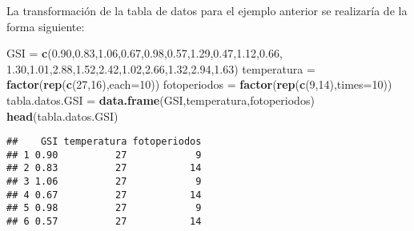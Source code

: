 \documentclass[
]{article}
\newenvironment{Shaded}{\begin{snugshade}}{\end{snugshade}}
\newcommand{\DataTypeTok}[1]{\textcolor[rgb]{0.13,0.29,0.53}{#1}}
\newcommand{\DecValTok}[1]{\textcolor[rgb]{0.00,0.00,0.81}{#1}}
\newcommand{\FloatTok}[1]{\textcolor[rgb]{0.00,0.00,0.81}{#1}}
\newcommand{\KeywordTok}[1]{\textcolor[rgb]{0.13,0.29,0.53}{\textbf{#1}}}
\newcommand{\NormalTok}[1]{#1}
\newcommand{\StringTok}[1]{\textcolor[rgb]{0.31,0.60,0.02}{#1}}
\begin{document}
\begin{example}

La transformación de la tabla de datos para el ejemplo anterior se
realizaría de la forma siguiente:

\begin{Shaded}
\begin{Highlighting}[]
\NormalTok{GSI =}\StringTok{ }\KeywordTok{c}\NormalTok{(}\FloatTok{0.90}\NormalTok{,}\FloatTok{0.83}\NormalTok{,}\FloatTok{1.06}\NormalTok{,}\FloatTok{0.67}\NormalTok{,}\FloatTok{0.98}\NormalTok{,}\FloatTok{0.57}\NormalTok{,}\FloatTok{1.29}\NormalTok{,}\FloatTok{0.47}\NormalTok{,}\FloatTok{1.12}\NormalTok{,}\FloatTok{0.66}\NormalTok{,}
        \FloatTok{1.30}\NormalTok{,}\FloatTok{1.01}\NormalTok{,}\FloatTok{2.88}\NormalTok{,}\FloatTok{1.52}\NormalTok{,}\FloatTok{2.42}\NormalTok{,}\FloatTok{1.02}\NormalTok{,}\FloatTok{2.66}\NormalTok{,}\FloatTok{1.32}\NormalTok{,}\FloatTok{2.94}\NormalTok{,}\FloatTok{1.63}\NormalTok{)}
\NormalTok{temperatura =}\StringTok{ }\KeywordTok{factor}\NormalTok{(}\KeywordTok{rep}\NormalTok{(}\KeywordTok{c}\NormalTok{(}\DecValTok{27}\NormalTok{,}\DecValTok{16}\NormalTok{),}\DataTypeTok{each=}\DecValTok{10}\NormalTok{))}
\NormalTok{fotoperiodos =}\StringTok{ }\KeywordTok{factor}\NormalTok{(}\KeywordTok{rep}\NormalTok{(}\KeywordTok{c}\NormalTok{(}\DecValTok{9}\NormalTok{,}\DecValTok{14}\NormalTok{),}\DataTypeTok{times=}\DecValTok{10}\NormalTok{))}
\NormalTok{tabla.datos.GSI =}\StringTok{ }\KeywordTok{data.frame}\NormalTok{(GSI,temperatura,fotoperiodos)}
\KeywordTok{head}\NormalTok{(tabla.datos.GSI)}
\end{Highlighting}
\end{Shaded}

\begin{verbatim}
##    GSI temperatura fotoperiodos
## 1 0.90          27            9
## 2 0.83          27           14
## 3 1.06          27            9
## 4 0.67          27           14
## 5 0.98          27            9
## 6 0.57          27           14
\end{verbatim}

\end{example}
\end{document}

